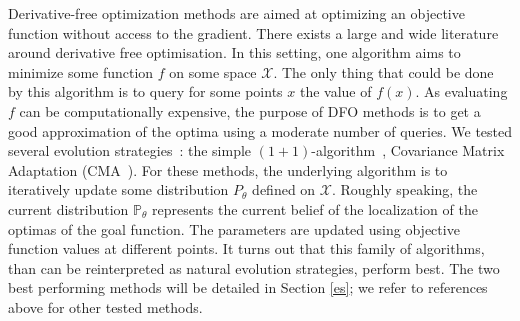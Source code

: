  Derivative-free optimization methods are aimed at optimizing an objective function without access to the gradient.
 There exists a large and wide literature around derivative free optimisation. In this setting, one algorithm aims to minimize some function $f$ on some space $\mathcal{X}$. The only thing that could be done by this algorithm is to query for some points $x$ the value of $f(x)$. As evaluating $f$ can be computationally expensive, the purpose of DFO methods is to get a good approximation of the optima using a moderate number of queries. 
%
%
%
We tested several evolution strategies~\citep{rechenberg73,Beyer:bookES}: the simple $(1+1)$-algorithm~\citep{opo1,opo2}, Covariance Matrix Adaptation (CMA~\citep{HAN}).
For these methods, the underlying algorithm is to iteratively update some distribution $P_\theta$ defined on $\mathcal{X}$. Roughly speaking, the current  distribution $\mathbb{P}_\theta$ represents the current belief of the localization of the optimas of the goal function.  The parameters are updated using objective function values at different points.
It turns out that this family of algorithms, than can be reinterpreted as natural evolution strategies, perform best. The two best performing methods will be detailed in Section \ref{es}; we refer to references above for other tested methods.

